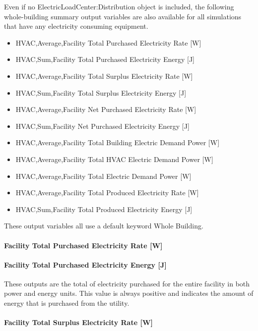 Even if no ElectricLoadCenter:Distribution object is included, the following whole-building summary output variables are also available for all simulations that have any electricity consuming equipment.

\begin{itemize}
\tightlist
\item
  HVAC,Average,Facility Total Purchased Electricity Rate {[}W{]}
\item
  HVAC,Sum,Facility Total Purchased Electricity Energy {[}J{]}
\item
  HVAC,Average,Facility Total Surplus Electricity Rate {[}W{]}
\item
  HVAC,Sum,Facility Total Surplus Electricity Energy {[}J{]}
\item
  HVAC,Average,Facility Net Purchased Electricity Rate {[}W{]}
\item
  HVAC,Sum,Facility Net Purchased Electricity Energy {[}J{]}
\item
  HVAC,Average,Facility Total Building Electric Demand Power {[}W{]}
\item
  HVAC,Average,Facility Total HVAC Electric Demand Power {[}W{]}
\item
  HVAC,Average,Facility Total Electric Demand Power {[}W{]}
\item
  HVAC,Average,Facility Total Produced Electricity Rate {[}W{]}
\item
  HVAC,Sum,Facility Total Produced Electricity Energy {[}J{]}
\end{itemize}

These output variables all use a default keyword Whole Building.

\paragraph{Facility Total Purchased Electricity Rate {[}W{]}}\label{facility-total-purchased-electric-power-w}

\paragraph{Facility Total Purchased Electricity Energy {[}J{]}}\label{facility-total-purchased-electric-energy-j}

These outputs are the total of electricity purchased for the entire facility in both power and energy units. This value is always positive and indicates the amount of energy that is purchased from the utility.

\paragraph{Facility Total Surplus Electricity Rate {[}W{]}}\label{facility-total-surplus-electric-power-w}

